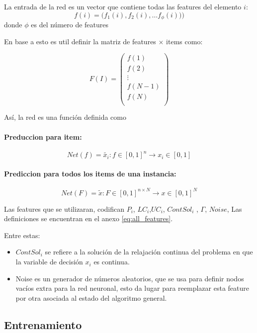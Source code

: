 \documentclass[spanish, a4paper, 12pt, openany,final]{book}
\begin{document}
La entrada de la red es un vector que contiene todas las features del elemento $i$:
$$
	f(i) = \textbf{(}f_1(i),f_2(i), \hdots f_\phi(i))\textbf{)}
$$
donde $\phi$ es del número de features

En base a esto es util definir la matriz de features $\times$ items como:

\begin{equation}
F(I) = 
\left( 
\begin{matrix}
	f(1)\\
	f(2)\\
	\vdots \\
	f(N-1)\\
	f(N)\\
\end{matrix}
\right)
\end{equation}


Así, la red es una función definida como
\paragraph*{Preduccion para item:}
$$
	Net(f) = \tilde{x_i}: f\in [0,1]^n \rightarrow x_i \in[0,1]
$$

\paragraph*{Prediccion para todos los items de una instancia:}

$$
	Net(F) = \tilde{x}: F\in [0,1]^{n\times N} \rightarrow x \in[0,1]^{N}
$$

Las features que se utilizaran, codifican $P_i$, $LC_i$,$UC_i$, $ContSol_i$ , $\Gamma$, $Noise$, Las definiciones se encuentran en el anexo \ref{eq:all_features}.

Entre estas:
\begin{itemize}
	\item $ContSol_i$ se refiere a la solución de la relajación continua del problema en que la variable de decisión $x_i$ es continua.
	\item Noise es un generador de números aleatorios, que se usa para definir nodos vacíos extra para la red neuronal, esto da lugar para reemplazar esta feature por otra asociada al estado del algoritmo general.
\end{itemize}


\subsection{Entrenamiento}
\end{document}
